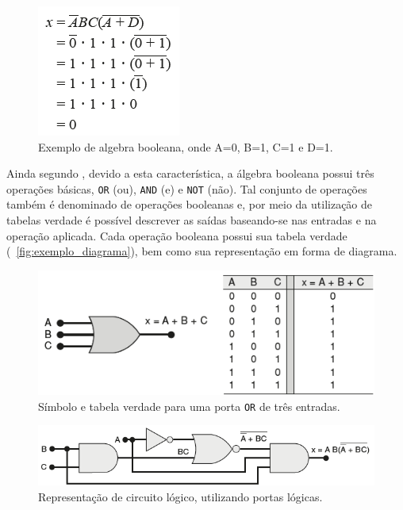\begin{figure}[H]
	\begin{center}
    \caption{\label{fig:algebra_booleana}Exemplo de algebra booleana, onde A=0, B=1, C=1 e D=1.}
	\includegraphics[scale=0.70]{Figuras/algebra_booleana.png}
	\end{center}
\end{figure}

\par
Ainda segundo , devido a esta característica, a álgebra booleana possui três operações básicas, \texttt{OR} (ou), \texttt{AND} (e) e \texttt{NOT} (não). Tal conjunto de operações também é denominado de operações booleanas e, por meio da utilização de tabelas verdade é possível descrever as saídas baseando-se nas entradas e na operação aplicada. Cada operação booleana possui sua tabela verdade (~\autoref{fig:exemplo_diagrama}), bem como sua representação em forma de diagrama.

\begin{figure}[H]
	\begin{center}
    \caption{\label{fig:exemplo_diagrama}Símbolo e tabela verdade para uma porta \texttt{OR} de três entradas.}
	\includegraphics[scale=0.60]{Figuras/exemplo_diagrama.png}
	\end{center}
\end{figure}

\begin{figure}[H]
	\begin{center}
    \caption{\label{fig:exemplo_circuito} Representação de circuito lógico, utilizando portas lógicas.}
	\includegraphics[scale=0.60]{Figuras/exemplo_circuito.png}
	\end{center}
\end{figure}

